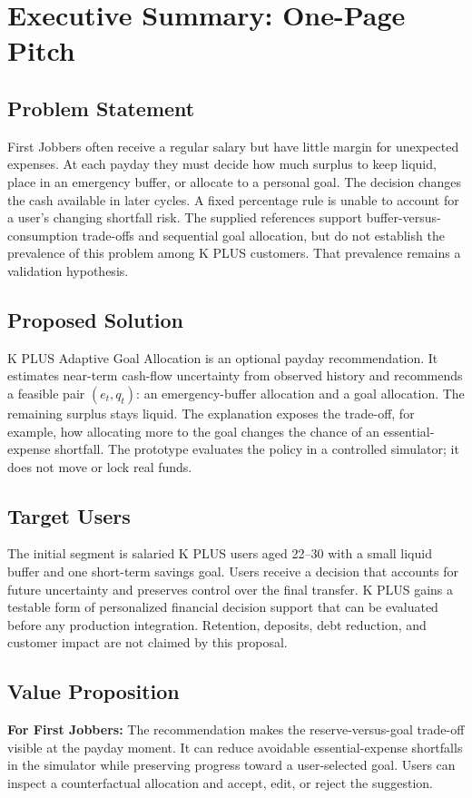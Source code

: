 \section{Executive Summary: One-Page Pitch}

\subsection{Problem Statement}
First Jobbers often receive a regular salary but have little margin for unexpected expenses. At each payday they must decide how much surplus to keep liquid, place in an emergency buffer, or allocate to a personal goal. The decision changes the cash available in later cycles. A fixed percentage rule is unable to account for a user's changing shortfall risk. The supplied references support buffer-versus-consumption trade-offs and sequential goal allocation, but do not establish the prevalence of this problem among K PLUS customers. That prevalence remains a validation hypothesis.

\subsection{Proposed Solution}
K PLUS Adaptive Goal Allocation is an optional payday recommendation. It estimates near-term cash-flow uncertainty from observed history and recommends a feasible pair $(e_t,q_t)$: an emergency-buffer allocation and a goal allocation. The remaining surplus stays liquid. The explanation exposes the trade-off, for example, how allocating more to the goal changes the chance of an essential-expense shortfall. The prototype evaluates the policy in a controlled simulator; it does not move or lock real funds.

\subsection{Target Users}
The initial segment is salaried K PLUS users aged 22--30 with a small liquid buffer and one short-term savings goal. Users receive a decision that accounts for future uncertainty and preserves control over the final transfer. K PLUS gains a testable form of personalized financial decision support that can be evaluated before any production integration. Retention, deposits, debt reduction, and customer impact are not claimed by this proposal.

\subsection{Value Proposition}
\textbf{For First Jobbers:} The recommendation makes the reserve-versus-goal trade-off visible at the payday moment. It can reduce avoidable essential-expense shortfalls in the simulator while preserving progress toward a user-selected goal. Users can inspect a counterfactual allocation and accept, edit, or reject the suggestion.

